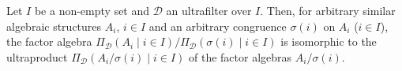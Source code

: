 Let $I$ be a non-empty set and $\mathcal{D}$ an ultrafilter over $I$. Then, for arbitrary similar algebraic structures $A_i$, $i\in I$ and an arbitrary congruence $\sigma(i)$ on $A_i$ ($i\in I$), the factor algebra $\Pi_{\mathcal{D}}(A_i\mid i\in I)/\Pi_{\mathcal{D}}(\sigma(i)\mid i\in I)$ is isomorphic to the ultraproduct $\Pi_{\mathcal{D}}(A_i/\sigma(i)\mid i\in I)$ of the factor algebras $A_i/\sigma(i)$.
